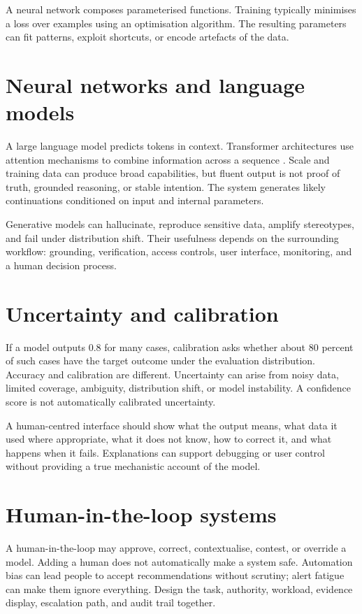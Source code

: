 A neural network composes parameterised functions. Training typically minimises a loss over examples using an optimisation algorithm. The resulting parameters can fit patterns, exploit shortcuts, or encode artefacts of the data.

\section{Neural networks and language models}
A large language model predicts tokens in context. Transformer architectures use attention mechanisms to combine information across a sequence \citep{vaswani2017attention}. Scale and training data can produce broad capabilities, but fluent output is not proof of truth, grounded reasoning, or stable intention. The system generates likely continuations conditioned on input and internal parameters.

Generative models can hallucinate, reproduce sensitive data, amplify stereotypes, and fail under distribution shift. Their usefulness depends on the surrounding workflow: grounding, verification, access controls, user interface, monitoring, and a human decision process.

\section{Uncertainty and calibration}
If a model outputs 0.8 for many cases, calibration asks whether about 80 percent of such cases have the target outcome under the evaluation distribution. Accuracy and calibration are different. Uncertainty can arise from noisy data, limited coverage, ambiguity, distribution shift, or model instability. A confidence score is not automatically calibrated uncertainty.

A human-centred interface should show what the output means, what data it used where appropriate, what it does not know, how to correct it, and what happens when it fails. Explanations can support debugging or user control without providing a true mechanistic account of the model.

\section{Human-in-the-loop systems}
A human-in-the-loop may approve, correct, contextualise, contest, or override a model. Adding a human does not automatically make a system safe. Automation bias can lead people to accept recommendations without scrutiny; alert fatigue can make them ignore everything. Design the task, authority, workload, evidence display, escalation path, and audit trail together.

